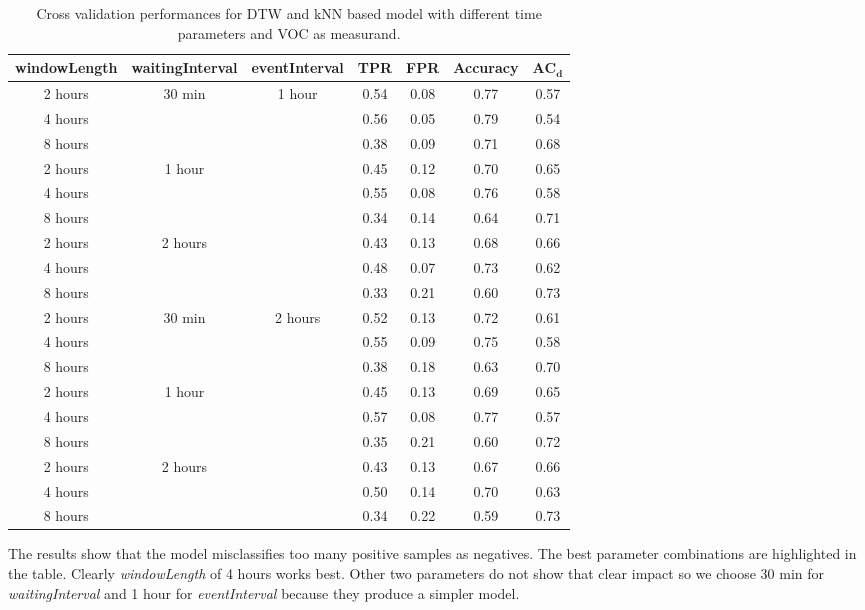 \begin{table}[here]
  \caption{Cross validation performances for DTW and kNN based model with different time parameters and VOC as measurand.} 
  \begin{tabular}{ c | c | c | c | c | c | c }
    \hline
   	\textbf{windowLength} & \textbf{waitingInterval} & \textbf{eventInterval} & \textbf{TPR} & \textbf{FPR} & \textbf{Accuracy} & $\mathbf{AC_d}$ \\
	\hline 
\rowcolor{Good}
2 hours & 30 min & 1  hour & 0.54 & 0.08 & 0.77 & 0.57 \\
\rowcolor{Good}
4 hours &  &  & 0.56 & 0.05 & 0.79 & 0.54 \\
8 hours &  &  & 0.38 & 0.09 & 0.71 & 0.68 \\
2 hours & 1  hour &  & 0.45 & 0.12 & 0.70 & 0.65 \\
\rowcolor{Good}
4 hours &  &  & 0.55 & 0.08 & 0.76 & 0.58 \\
8 hours &  &  & 0.34 & 0.14 & 0.64 & 0.71 \\
2 hours & 2 hours &  & 0.43 & 0.13 & 0.68 & 0.66 \\
4 hours &  &  & 0.48 & 0.07 & 0.73 & 0.62 \\
8 hours &  &  & 0.33 & 0.21 & 0.60 & 0.73 \\
2 hours & 30 min & 2 hours & 0.52 & 0.13 & 0.72 & 0.61 \\
\rowcolor{Good}
4 hours &  &  & 0.55 & 0.09 & 0.75 & 0.58 \\
8 hours &  &  & 0.38 & 0.18 & 0.63 & 0.70 \\
2 hours & 1  hour &  & 0.45 & 0.13 & 0.69 & 0.65 \\
\rowcolor{Good}
4 hours &  & & 0.57 & 0.08 & 0.77 & 0.57 \\
8 hours &  &  & 0.35 & 0.21 & 0.60 & 0.72 \\
2 hours & 2 hours &  & 0.43 & 0.13 & 0.67 & 0.66 \\
4 hours &  &  & 0.50 & 0.14 & 0.70 & 0.63 \\
8 hours &  &  & 0.34 & 0.22 & 0.59 & 0.73 \\
	\hline
  \end{tabular}
  \label{table:voc_dtwknn_1}
\end{table}

The results show that the model misclassifies too many positive samples as negatives. The best parameter combinations are highlighted in the table. Clearly \emph{windowLength} of 4 hours works best. Other two parameters do not show that clear impact so we choose 30 min for \emph{waitingInterval} and 1 hour for \emph{eventInterval} because they produce a simpler model.

